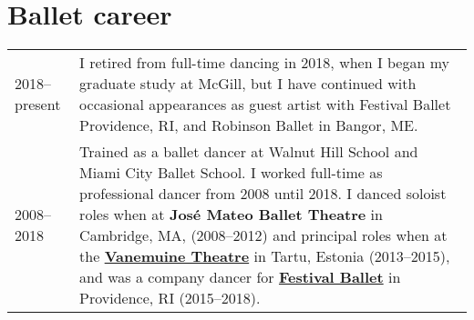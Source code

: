 \documentclass[11pt,a4paper]{article}
\begin{document}
  \section{Ballet career}
  \begin{longtable}{p{2cm}|p{14.5cm}}
    2018--present
    &%
      I retired from full-time dancing in 2018, when I began my graduate study
      at McGill, but I have continued with occasional appearances as guest
      artist with Festival Ballet Providence, RI, and Robinson Ballet in Bangor,
      ME.\\
    \textsc{2008--2018}
    &%
      Trained as a ballet dancer at Walnut Hill School and Miami City Ballet
      School. I worked full-time as professional dancer from 2008 until 2018. I
      danced soloist roles when at \textbf{José Mateo Ballet Theatre} in
      Cambridge, MA, (2008--2012) and principal roles when at the
      \href{http://vanemuine.ee}{\textbf{Vanemuine Theatre}} in Tartu, Estonia
      (2013--2015), and was a company dancer for
      \href{http://festivalballetprovidence.org}{\textbf{Festival Ballet}} in
      Providence, RI (2015--2018).\\
  \end{longtable}

  
\end{document}
